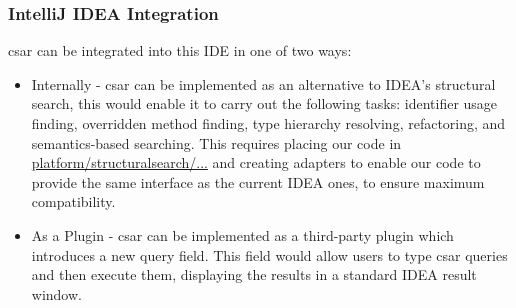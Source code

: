 \documentclass[12pt, letterpaper]{article}
\begin{document}
\subsubsection{IntelliJ IDEA Integration}
csar can be integrated into this IDE in one of two ways:
\begin{itemize}
    \item Internally - csar can be implemented as an alternative to IDEA's structural search,
    this would enable it to carry out the following tasks:
    identifier usage finding, overridden method finding, type hierarchy resolving, refactoring, and semantics-based searching.
    This requires placing our code in \href{https://github.com/JetBrains/intellij-community/tree/master/platform/structuralsearch/source/com/intellij/structuralsearch}{platform/structuralsearch/...} and creating adapters to enable our code to provide the same interface as the current IDEA ones, to ensure maximum compatibility.
    \item As a Plugin - csar can be implemented as a third-party plugin which introduces a new query field.
    This field would allow users to type csar queries and then execute them, displaying the results in a standard IDEA result window.
\end{itemize}
\end{document}

